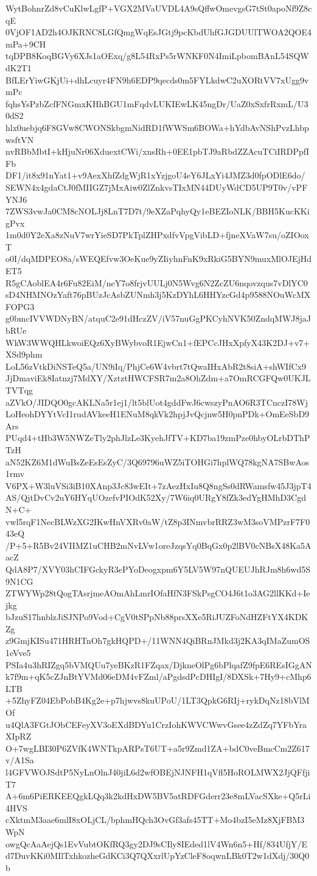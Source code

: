 WytBohnrZd8vCuKlwLgfP+VGX2MVaUVDL4A9sQffwOmevgsG7tSt0apoNf9Z8cqE
0VjOF1AD2h4OJKRNC8LGfQmgWqEsJGtj9pcKbdUhfGJGDUUlTWOA2QOE4mPa+9CH
tqDPB8KoqBGVy6XJs1aOExq/g8L54RxPs5rWNKF0N4ImiLpbomBAnL54SQWdK2T1
BfLErYiwGKjUi+dhLcuyr4FN9h6EDP9qecds0m5FYLkdwC2uXORtVV7xUgg9vmPc
fqhsYsPzbZcfFNGmxKHhBGU1mFqdvLUKIEwLK45ngDr/UaZ0xSxfrRxmL/U30dS2
hlx0uebjq6F8GVw8CWONSkbgmNidRD1fWWSm6BOWa+hYdbAvNShPvzLhbpwsftVN
nvRBbMbtI+kHjuNr06XduextCWi/xnsRh+0EE1pbTJ9aRbdZZAcuTCiIRDPpfIFb
DF1/it8x91nYat1+v9AexXhfZdgWjR1xYzjgoU4eY6JLxYi4JMZ3d0fpODlE6do/
SEWN4x4gdaCtJ0fMIIGZ7jMxAiw0ZlZnkvsTIxMN44DUyWdCD5UP9T0v/vPFYNJ6
7ZWS3vwJa0CM8cNOLJj8LnT7D7t/9eXZaPqhyQy1eBEZIoNLK/BBH5KucKKigPvx
1m0d0Y2eXa8zNuV7wrYieSD7PkTplZHPxdfvVpgVibLD+fjneXVaW7su/oZIOoxT
o0I/dqMDPEO8a/sWEQEfvw3OeKue9yZIiyhnFnK9xRkiG5BYN9muxMlOJEjHdET5
R5gCAoblEA4r6Fu82EiM/neY7o8frjvUULj0N5Wvg6N2ZcZU6nqovzqus7vDlYC0
sD4NHMNOzYaft76pBUzJcAsbZUNmh3j5KzDYhL6HHYzcGd4p9588NOuWcMXFOPG3
g0bmcIVVWDNyBN/atquC2e91dHczZV/iV57nuGgPKCyhNVK50ZndqMWJ8jaJbRUe
WkW3WWQHLkwoiEQz6XyBWybvoR1EjwCn1+fEPCcJHxXpfyX43K2DJ+v7+XSd9phm
LoL56zVtkDiNSTeQ5a/UN9iIq/PhjCe6W4vbrt7tQwaIHxAbR2t8siA+shWIfCx9
JjDmaviEk8Iatnzj7MdXY/XztztHWCFSR7m2a8OhZdm+a7OmRCGFQw0UKJLTVTqg
aZVkO/JIDQO0gcAKLNa5r1ej1/lt5blUot4gddFwJ6cwszyPnAO6R3TCnczI78Wj
LoHeohDYYtVcI1rudAVkeeH1ENuM8qkVk2hpjJvQcjnw5H0pnPDk+OmEeSbD9Ars
PUqd4+tHb3W5NWZeTly2phJlzLe3KyehJfTV+KD7ba19zmPze0hbyOLrbDThPTzH
aN52KZ6M1dWuBsZeEsEsZyC/3Q69796uWZ5iTOHGi7hplWQ78kgNA7SBwAos1rmv
V6PX+W3luVSi3iB10XAnp3Jc83wEIt+7zAezHxIu8Q8ngSs0dRWamsfw45J3jpT4
AS/QjtDvCv2uY6HYqUOzefvPIOdK52Xy/7W6iq0URgY8fZk3edYgHMhD3CgdN+C+
vwl5rqF1NecBLWzXG2IKwHnVXRv0aW/tZ8p3INmvbrRRZ3wM3soVMPzrF7F043eQ
/P+5+R5Bv24VIIMZ1uCHB2mNvLVw1oreJzqsYq0BqGx0p2lBV0cNBsX48Ka5AacZ
QdA8P7/XVY03hCIFGckyR3ePYoDeogxpm6Y5LV5W97nQUEUJhRJm8h6wd5S9N1CG
ZTWYWp28tQogTAsrjmeAOmAhLmrIOfaHfN3FSkPsgCO4J6t1o3AG2llKKd+Iejkg
bJzuS17hnblzJiSJNPo9Vod+CgV0tSPpNb88prsXXe5RiJUZFoNdHZFtYX4KDKZg
z9GmjKISu471HRHTnOh7gkHQPD+/11WNN4QiBRnJMkd3j2KA3qIMaZumOS1eVve5
PSIa4u3hRIZgq5bVMQUu7yeBKzR1FZqax/DjkneOlPg6bPlqafZ9fpE6REsIGgAN
k7f9m+qK5cZJnBtYVMd06eDM4vFZml/aPgdsdPcDHIgI/8DXSk+7Hy9+cMhp6LTB
+5ZhyFZ04EbPobB4Kg2e+p7hjwvs8kuUPoU/1LT3QpkG6RIj+rykDqNz18bVlMOf
u4QlA3FGtJObCEFeyXV3oEXdBDYu1CrzIohKWVCWwvGsee4zZdZq7YFbYraXIpRZ
O+7wgLBI30P6ZVfK4WNTkpARPsT6UT+a5r9Zmd1ZA+bdC0veBmcCm2Z617v/A1Sa
l4GFVWOJSdtP5NyLnOlnJ40jiL6d2wfOBEjNJNFH1qVfl5HoROLMWX2JjQFfjiT7
A+6m6PiERKEEQgkLQq3k2kdHxDW5BV5atRDFGderr23e8mLVacSXke+Q5rLi4HVS
cXktmM3aae6mlI8xOLjCL/bphmHQch3OvGf3afs45TT+Mo4bzI5eMz8XjFBM3WpN
owgQcAaAejQs1EvVubtOKfRQ3gy2DJ9sCIly8IEded1lV4Wn6n5+Hf/834UfjY/E
d7DuvKKi0MIlTxhkozheGdKCi3Q7QXxrlUpYzCleF8oqwnLBk0T2w1dXdj/30Q0b
